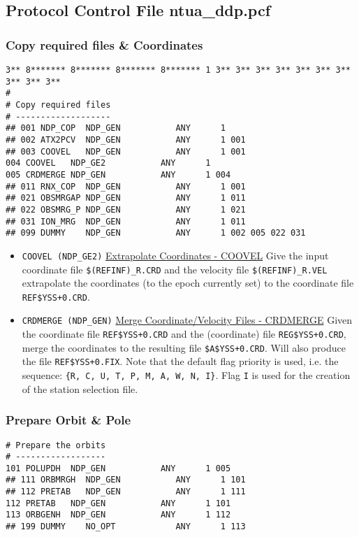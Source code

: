 \subsection{Protocol Control File ntua\_ddp.pcf}
\label{ntuaddppcf}

\subsubsection{Copy required files \& Coordinates}\label{ddp-crfc}
\begin{verbatim}
3** 8******* 8******* 8******* 8******* 1 3** 3** 3** 3** 3** 3** 3** 3** 3** 3**
#
# Copy required files
# -------------------
## 001 NDP_COP  NDP_GEN           ANY      1
## 002 ATX2PCV  NDP_GEN           ANY      1 001
## 003 COOVEL   NDP_GEN           ANY      1 001
004 COOVEL   NDP_GE2           ANY      1
005 CRDMERGE NDP_GEN           ANY      1 004
## 011 RNX_COP  NDP_GEN           ANY      1 001
## 021 OBSMRGAP NDP_GEN           ANY      1 011
## 022 OBSMRG_P NDP_GEN           ANY      1 021
## 031 ION_MRG  NDP_GEN           ANY      1 011
## 099 DUMMY    NDP_GEN           ANY      1 002 005 022 031
\end{verbatim}

\begin{itemize}
  \item \texttt{COOVEL (NDP\_GE2)} \underline{Extrapolate Coordinates - COOVEL}
    Give the input coordinate file \texttt{\$(REFINF)\_R.CRD} and the velocity
    file \texttt{\$(REFINF)\_R.VEL} extrapolate the coordinates (to the epoch
    currently set) to the coordinate file \texttt{REF\$YSS+0.CRD}.
  \item \texttt{CRDMERGE (NDP\_GEN)} \underline{Merge Coordinate/Velocity Files - CRDMERGE}
    Given the coordinate file \texttt{REF\$YSS+0.CRD} and the (coordinate) file
    \texttt{REG\$YSS+0.CRD}, merge the coordinates to the resulting file
    \texttt{\$A\$YSS+0.CRD}. Will also produce the file \texttt{REF\$YSS+0.FIX}.
    Note that the default flag priority is used, i.e. the sequence: 
    \texttt{\{R, C, U, T, P, M, A, W, N, I\}}. Flag \texttt{I} is used for the
    creation of the station selection file.
\end{itemize}

\subsubsection{Prepare Orbit \& Pole}\label{ddp-poap}
\begin{verbatim}
# Prepare the orbits
# ------------------
101 POLUPDH  NDP_GEN           ANY      1 005
## 111 ORBMRGH  NDP_GEN           ANY      1 101
## 112 PRETAB   NDP_GEN           ANY      1 111
112 PRETAB   NDP_GEN           ANY      1 101
113 ORBGENH  NDP_GEN           ANY      1 112
## 199 DUMMY    NO_OPT            ANY      1 113
\end{verbatim}

